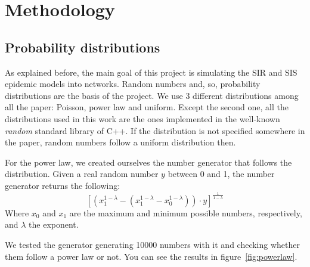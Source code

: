 \section{Methodology}
\subsection{Probability distributions}
As explained before, the main goal of this project is simulating the SIR and SIS epidemic models into networks. Random numbers and, so, probability distributions are the basis of the project. We use 3 different distributions among all the paper: Poisson, power law and uniform. Except the second one, all the distributions used in this work are the ones implemented in the well-known \textit{random} standard library of C++. If the distribution is not specified somewhere in the paper, random numbers follow a uniform distribution then.

For the power law, we created ourselves the number generator that follows the distribution. Given a real random number $y$ between 0 and 1, the number generator returns the following: $$[(x_1^{1-\lambda}-(x_1^{1-\lambda}-x_0^{1-\lambda}))\cdot y]^\frac{1}{1-\lambda}$$
Where $x_0$ and $x_1$ are the maximum and minimum possible numbers, respectively, and $\lambda$ the exponent.

We tested the generator generating 10000 numbers with it and checking whether them follow a power law or not. You can see the results in figure~\ref{fig:powerlaw}. 

